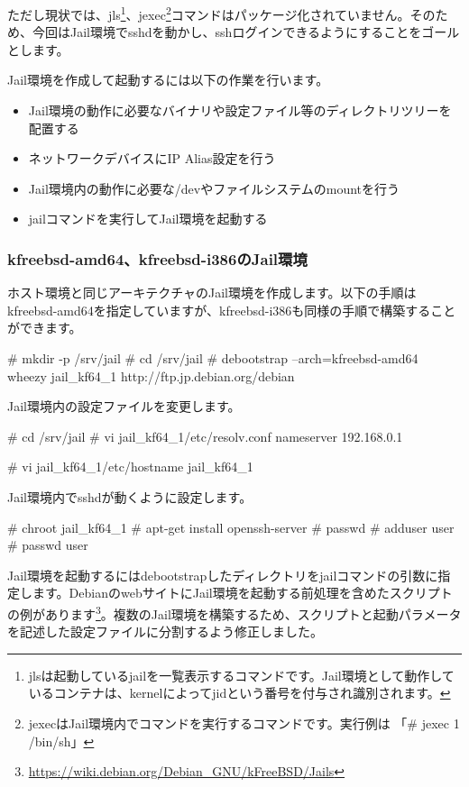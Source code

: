 \documentclass[mingoth,a4paper]{jsarticle}
\begin{document}
ただし現状では、jls\footnote{jlsは起動しているjailを一覧表示するコマンドです。Jail環境として動作しているコンテナは、kernelによってjidという番号を付与され識別されます。}、jexec\footnote{jexecはJail環境内でコマンドを実行するコマンドです。実行例は 「\# jexec 1 /bin/sh」}コマンドはパッケージ化されていません。そのため、今回はJail環境でsshdを動かし、sshログインできるようにすることをゴールとします。

Jail環境を作成して起動するには以下の作業を行います。

\begin{itemize}
  \item Jail環境の動作に必要なバイナリや設定ファイル等のディレクトリツリーを配置する
  \item ネットワークデバイスにIP Alias設定を行う
  \item Jail環境内の動作に必要な/devやファイルシステムのmountを行う
  \item jailコマンドを実行してJail環境を起動する
\end{itemize}


\subsubsection{kfreebsd-amd64、kfreebsd-i386のJail環境}

ホスト環境と同じアーキテクチャのJail環境を作成します。以下の手順はkfreebsd-amd64を指定していますが、kfreebsd-i386も同様の手順で構築することができます。

\begin{commandline}
# mkdir -p /srv/jail
# cd /srv/jail
# debootstrap --arch=kfreebsd-amd64 wheezy jail_kf64_1 http://ftp.jp.debian.org/debian
\end{commandline}

Jail環境内の設定ファイルを変更します。

\begin{commandline}
# cd /srv/jail
# vi jail_kf64_1/etc/resolv.conf
nameserver 192.168.0.1

# vi jail_kf64_1/etc/hostname
jail_kf64_1
\end{commandline}

Jail環境内でsshdが動くように設定します。

\begin{commandline}
# chroot jail_kf64_1
# apt-get install openssh-server
# passwd
# adduser user
# passwd user
\end{commandline}

Jail環境を起動するにはdebootstrapしたディレクトリをjailコマンドの引数に指定します。DebianのwebサイトにJail環境を起動する前処理を含めたスクリプトの例があります\footnote{\url{https://wiki.debian.org/Debian_GNU/kFreeBSD/Jails}}。複数のJail環境を構築するため、スクリプトと起動パラメータを記述した設定ファイルに分割するよう修正しました。
\end{document}

